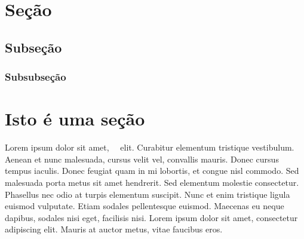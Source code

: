 \section{Seção}
\subsection{Subseção}
\subsubsection{Subsubseção}

\section{Isto é uma seção}
Lorem ipsum dolor sit amet,\ \  elit. Curabitur elementum tristique vestibulum.
Aenean et nunc malesuada, cursus velit vel, convallis mauris. Donec cursus tempus iaculis. Donec feugiat quam in mi lobortis,
et congue nisl commodo. Sed malesuada porta metus sit amet hendrerit. Sed elementum molestie consectetur.
Phasellus nec odio at turpis elementum suscipit. Nunc et enim tristique ligula euismod vulputate.
Etiam sodales pellentesque euismod. Maecenas eu neque dapibus, sodales nisi eget, facilisis nisi. Lorem ipsum dolor sit amet,
consectetur adipiscing elit. Mauris at auctor metus, vitae faucibus eros.
